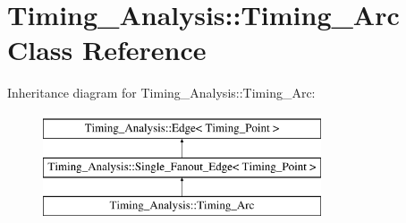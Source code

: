 \hypertarget{classTiming__Analysis_1_1Timing__Arc}{\section{Timing\-\_\-\-Analysis\-:\-:Timing\-\_\-\-Arc Class Reference}
\label{classTiming__Analysis_1_1Timing__Arc}
}
Inheritance diagram for Timing\-\_\-\-Analysis\-:\-:Timing\-\_\-\-Arc\-:\begin{figure}[H]
\begin{center}
\leavevmode
\includegraphics[height=3.000000cm]{classTiming__Analysis_1_1Timing__Arc}
\end{center}
\end{figure}
